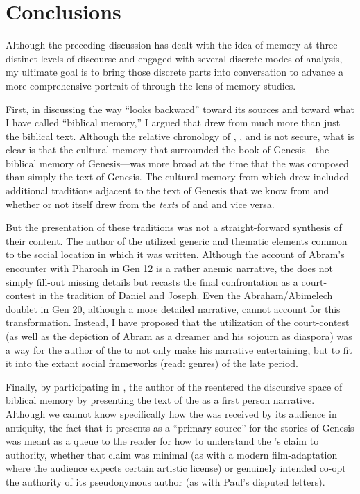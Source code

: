 \section{Conclusions}

Although the preceding discussion has dealt with the idea of memory at three distinct levels of discourse and engaged with several discrete modes of analysis, my ultimate goal is to bring those discrete parts into conversation to advance a more comprehensive portrait of \ga through the lens of memory studies.

First, in discussing the way \ga ``looks backward'' toward its sources and toward what I have called ``biblical memory,'' I argued that \ga drew from much more than just the biblical text. Although the relative chronology of \firstenoch, \jub, and \ga is not secure,%
what is clear is that the cultural memory that surrounded the book of Genesis---the biblical memory of Genesis---was more broad at the time that the \ga was composed than simply the text of Genesis. The cultural memory from which \ga drew included additional traditions adjacent to the text of Genesis that we know from \jub and \firstenoch whether or not \ga itself drew from the \emph{texts} of \jub and \firstenoch and vice versa.

But the presentation of these traditions was not a straight-forward synthesis of their content. The author of the \ga utilized generic and thematic elements common to the social location in which it was written. Although the account of Abram's encounter with Pharoah in Gen 12 is a rather anemic narrative, the \ga does not simply fill-out missing details but recasts the final confrontation as a court-contest in the tradition of Daniel and Joseph. Even the Abraham/Abimelech doublet in Gen 20, although a more detailed narrative, cannot account for this transformation. Instead, I have proposed that the utilization of the court-contest (as well as the depiction of Abram as a dreamer and his sojourn as diaspora) was a way for the author of the \ga to not only make his narrative entertaining, but to fit it into the extant social frameworks (read: genres) of the late \secondtemple period.

Finally, by participating in \psy, the author of the \ga reentered the discursive space of biblical memory by presenting the text of the \ga as a first person narrative. Although we cannot know specifically how the \ga was received by its audience in antiquity, the fact that it presents as a ``primary source'' for the stories of Genesis was meant as a queue to the reader for how to understand the \ga's claim to authority, whether that claim was minimal (as with a modern film-adaptation where the audience expects certain artistic license) or genuinely intended co-opt the authority of its pseudonymous author (as with Paul's disputed letters).

